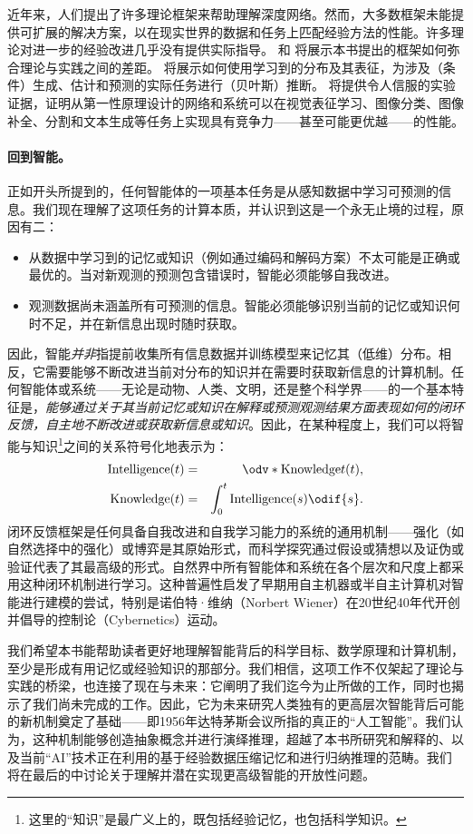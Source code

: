 \documentclass[../../book-main_zh.tex]{subfiles}
\begin{document}
近年来，人们提出了许多理论框架来帮助理解深度网络。然而，大多数框架未能提供可扩展的解决方案，以在现实世界的数据和任务上匹配经验方法的性能。许多理论对进一步的经验改进几乎没有提供实际指导。
和 
将展示本书提出的框架如何弥合理论与实践之间的差距。
将展示如何使用学习到的分布及其表征，为涉及（条件）生成、估计和预测的实际任务进行（贝叶斯）推断。
将提供令人信服的实验证据，证明从第一性原理设计的网络和系统可以在视觉表征学习、图像分类、图像补全、分割和文本生成等任务上实现具有竞争力——甚至可能更优越——的性能。

\paragraph{回到智能。}
正如开头所提到的，任何智能体的一项基本任务是从感知数据中学习可预测的信息。我们现在理解了这项任务的计算本质，并认识到这是一个永无止境的过程，原因有二：
\begin{itemize}
    \item 从数据中学习到的记忆或知识（例如通过编码和解码方案）不太可能是正确或最优的。当对新观测的预测包含错误时，智能必须能够自我改进。
    \item 观测数据尚未涵盖所有可预测的信息。智能必须能够识别当前的记忆或知识何时不足，并在新信息出现时随时获取。
\end{itemize}

因此，智能\textit{并非}指提前收集所有信息数据并训练模型来记忆其（低维）分布。相反，它需要能够不断改进当前对分布的知识并在需要时获取新信息的计算机制。任何智能体或系统——无论是动物、人类、文明，还是整个科学界——的一个基本特征是，\textit{能够通过关于其当前记忆或知识在解释或预测观测结果方面表现如何的闭环反馈，自主地不断改进或获取新信息或知识}。因此，在某种程度上，我们可以将智能与知识\footnote{这里的“知识”是最广义上的，既包括经验记忆，也包括科学知识。}之间的关系符号化地表示为：
\begin{eqnarray*}
    \operatorname{Intelligence}(t) &=&
    \odv*{\operatorname{Knowledge}}{t}(t), \\
    \operatorname{Knowledge}(t)  &=& \int_{0}^{t}
    \operatorname{Intelligence}(s) \odif{s}.
\end{eqnarray*}
闭环反馈框架是任何具备自我改进和自我学习能力的系统的通用机制——强化（如自然选择中的强化）或博弈是其原始形式，而科学探究通过假设或猜想以及证伪或验证代表了其最高级的形式。自然界中所有智能体和系统在各个层次和尺度上都采用这种闭环机制进行学习。这种普遍性启发了早期用自主机器或半自主计算机对智能进行建模的尝试，特别是诺伯特·维纳（Norbert
Wiener）在20世纪40年代开创并倡导的控制论（Cybernetics）运动。

我们希望本书能帮助读者更好地理解智能背后的科学目标、数学原理和计算机制，至少是形成有用记忆或经验知识的那部分。我们相信，这项工作不仅架起了理论与实践的桥梁，也连接了现在与未来：它阐明了我们迄今为止所做的工作，同时也揭示了我们尚未完成的工作。因此，它为未来研究人类独有的更高层次智能背后可能的新机制奠定了基础——即1956年达特茅斯会议所指的真正的“人工智能”。我们认为，这种机制能够创造抽象概念并进行演绎推理，超越了本书所研究和解释的、以及当前“AI”技术正在利用的基于经验数据压缩记忆和进行归纳推理的范畴。我们将在最后的中讨论关于理解并潜在实现更高级智能的开放性问题。
\end{document}
